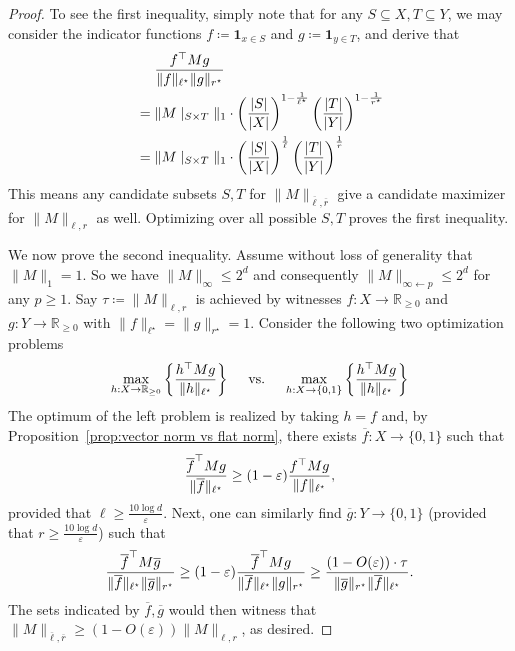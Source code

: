 \documentclass[11pt]{article}
\newcommand{\1}{ \mathbbm{1}}
\newcommand{\eps}{\varepsilon}
\begin{document}
\begin{proof}
    To see the first inequality, simply note that for any $S\subseteq X,T\subseteq Y$, we may consider the indicator functions $f\coloneqq \mathbf{1}_{x\in S}$ and $g\coloneqq \mathbf{1}_{y\in T}$, and derive that
    \begin{align}
        &~~~~\frac{f^\top M g}{\|f\|_{\ell^\star}\|g\|_{r^\star}} \notag \\
        &= \| M\mid_{S\times T}\|_1\cdot \left(\frac{|S|}{|X|}\right)^{1-\frac{1}{\ell^\star}} \left( \frac{|T|}{|Y|} \right)^{1-\frac{1}{r^\star}} \notag \\
        &=  \| M\mid_{S\times T}\|_1\cdot \left(\frac{|S|}{|X|}\right)^{\frac{1}{\ell}} \left( \frac{|T|}{|Y|} \right)^{\frac{1}{r}}  \notag
    \end{align}
    This means any candidate subsets $S,T$ for $\|M\|_{\overline{\ell},\overline{r}}$ give a candidate maximizer for $\|M\|_{\ell, r}$ as well. Optimizing over all possible $S,T$ proves the first inequality.

    We now prove the second inequality. Assume without loss of generality that $\|M\|_1 = 1$. So we have $\|M\|_{\infty}\le 2^d$ and consequently $\|M\|_{\infty\gets p}\le 2^d$ for any $p\ge 1$. Say $\tau \coloneqq \|M\|_{\ell, r}$ is achieved by witnesses $f:X\to \mathbb{R}_{\ge 0}$ and $g:Y\to \mathbb{R}_{\ge 0}$ with $\|f\|_{\ell^\star} = \|g\|_{r^\star} = 1$. Consider the following two optimization problems
    \begin{align}
        \max_{h:X\to \mathbb{R}_{\ge 0}}\left\{ \frac{h^\top M g}{\|h\|_{\ell^\star}} \right\} \text{~~~~vs.~~~~} \max_{h:X\to \{0,1\}}\left\{ \frac{h^\top M g}{\|h\|_{\ell^\star} } \right\}\notag 
    \end{align}
    The optimum of the left problem is realized by taking $h=f$ and, by Proposition~\ref{prop:vector norm vs flat norm}, there exists $\overline{f}:X\to \{0, 1\}$ such that
    \begin{align}
        \frac{\overline{f}^\top M g}{\|\overline{f}\|_{\ell^\star} } \ge (1-\eps)  \frac{f^\top M g}{\|f\|_{\ell^\star} }, \notag
    \end{align}
    provided that $\ell \ge \frac{10 \log d}{\eps}$. Next, one can similarly find $\overline{g}:Y\to \{0,1\}$ (provided that $r\ge \frac{10 \log d}{\eps}$) such that
    \begin{align}
        \frac{\overline{f}^\top M \overline{g}}{\|\overline{f}\|_{\ell^\star} \| \overline{g}\|_{r^\star} } \ge (1-\eps) \frac{\overline{f}^\top M g}{\|\overline{f}\|_{\ell^\star} \| g\|_{r^\star} } \ge \frac{(1-O(\eps))\cdot \tau}{\|\overline{g}\|_{r^\star} \|\overline{f}\|_{\ell^\star}} . \notag
    \end{align}
    The sets indicated by $\overline{f},\overline{g}$ would then witness that $\|M\|_{\overline{\ell},\overline{r}} \ge (1-O(\eps)) \|M\|_{\ell, r}$, as desired.
\end{proof}
\end{document}
